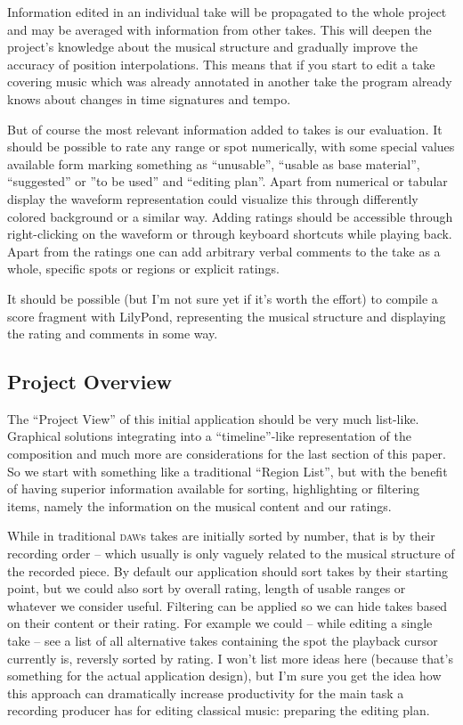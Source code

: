 \documentclass[11pt,a4paper]{article}
\begin{document}
Information edited in an individual take will be propagated to the whole project and may be averaged with information from other takes.
This will deepen the project's knowledge about the musical structure and gradually improve the accuracy of position interpolations.
This means that if you start to edit a take covering music which was already annotated in another take the program already knows about changes in time signatures and tempo.

But of course the most relevant information added to takes is our evaluation.
It should be possible to rate any range or spot numerically, with some special values available form marking something as “unusable”, “usable as base material”, “suggested” or ”to be used” and “editing plan”.
Apart from numerical or tabular display the waveform representation could visualize this through differently colored background or a similar way.
Adding ratings should be accessible through right-clicking on the waveform or through keyboard shortcuts while playing back.
Apart from the ratings one can add arbitrary verbal comments to the take as a whole, specific spots or regions or explicit ratings.

It should be possible (but I'm not sure yet if it's worth the effort) to compile a score fragment with LilyPond, representing the musical structure and displaying the rating and comments in some way.

\subsection{Project Overview}
The “Project View” of this initial application should be very much list-like.
Graphical solutions integrating into a “timeline”-like representation of the composition and much more are considerations for the last section of this paper.
So we start with something like a traditional “Region List”, but with the benefit of having superior information available for sorting, highlighting or filtering items, namely the information on the musical content and our ratings.

While in traditional \textsc{daw}s takes are initially sorted by number, that is by their recording order -- which usually is only vaguely related to the musical structure of the recorded piece.
By default our application should sort takes by their starting point, but we could also sort by overall rating, length of usable ranges or whatever we consider useful.
Filtering can be applied so we can hide takes based on their content or their rating.
For example we could -- while editing a single take -- see a list of all alternative takes containing the spot the playback cursor currently is, reversly sorted by rating.
I won't list more ideas here (because that's something for the actual application design), but I'm sure you get the idea how this approach can dramatically increase productivity for the main task a recording producer has for editing classical music: preparing the editing plan.
\end{document}
